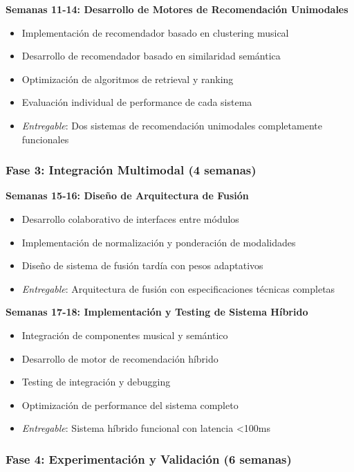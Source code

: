 \documentclass[12pt,a4paper]{article}
\begin{document}
\textbf{Semanas 11-14: Desarrollo de Motores de Recomendación Unimodales}
\begin{itemize}
    \item Implementación de recomendador basado en clustering musical
    \item Desarrollo de recomendador basado en similaridad semántica
    \item Optimización de algoritmos de retrieval y ranking
    \item Evaluación individual de performance de cada sistema
    \item \textit{Entregable}: Dos sistemas de recomendación unimodales completamente funcionales
\end{itemize}

\subsubsection{Fase 3: Integración Multimodal (4 semanas)}

\textbf{Semanas 15-16: Diseño de Arquitectura de Fusión}
\begin{itemize}
    \item Desarrollo colaborativo de interfaces entre módulos
    \item Implementación de normalización y ponderación de modalidades
    \item Diseño de sistema de fusión tardía con pesos adaptativos
    \item \textit{Entregable}: Arquitectura de fusión con especificaciones técnicas completas
\end{itemize}

\textbf{Semanas 17-18: Implementación y Testing de Sistema Híbrido}
\begin{itemize}
    \item Integración de componentes musical y semántico
    \item Desarrollo de motor de recomendación híbrido
    \item Testing de integración y debugging
    \item Optimización de performance del sistema completo
    \item \textit{Entregable}: Sistema híbrido funcional con latencia <100ms
\end{itemize}

\subsubsection{Fase 4: Experimentación y Validación (6 semanas)}
\end{document}
